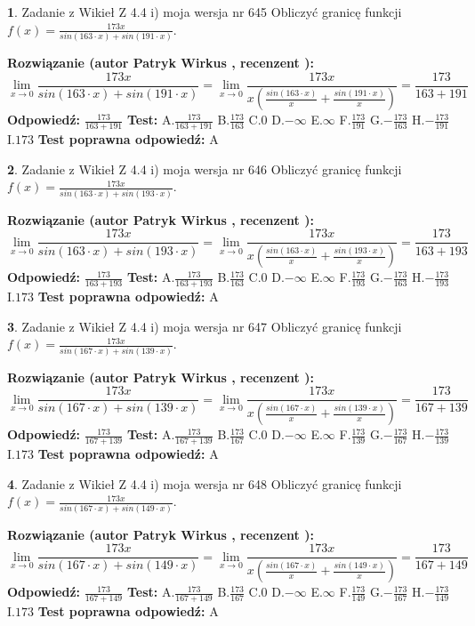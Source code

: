 \documentclass[12pt, a4paper]{article}
\theoremstyle{definition} %
\newtheorem{zad}{}
\newcommand{\zadStart}[1]{\begin{zad}#1\newline}
\newcommand{\zadStop}{\end{zad}}
\newcommand{\rozwStart}[2]{\noindent \textbf{Rozwiązanie (autor #1 , recenzent #2): }\newline}
\newcommand{\rozwStop}{\newline}
\newcommand{\odpStart}{\noindent \textbf{Odpowiedź:}\newline}
\newcommand{\odpStop}{\newline}
\newcommand{\testStart}{\noindent \textbf{Test:}\newline}
\newcommand{\testStop}{\newline}
\newcommand{\kluczStart}{\noindent \textbf{Test poprawna odpowiedź:}\newline}
\newcommand{\kluczStop}{\newline}
\begin{document}
\zadStart{Zadanie z Wikieł Z 4.4 i) moja wersja nr 645}
Obliczyć granicę funkcji $f(x)=\frac{173x}{sin(163\cdot x) +sin(191\cdot x)}$.
\zadStop
\rozwStart{Patryk Wirkus}{}
$$\lim\limits_{x\to 0}\frac{173x}{sin(163\cdot x) +sin(191\cdot x)}=\lim\limits_{x\to 0}\frac{173x}{x(\frac{sin(163\cdot x)}{x}+\frac{sin(191\cdot x)}{x})}=\frac{173}{163+191}$$
\rozwStop
\odpStart
$\frac{173}{163+191}$
\odpStop
\testStart
A.$\frac{173}{163+191}$
B.$\frac{173}{163}$
C.$0$
D.$-\infty$
E.$\infty$
F.$\frac{173}{191}$
G.$-\frac{173}{163}$
H.$-\frac{173}{191}$
I.$173$
\testStop
\kluczStart
A
\kluczStop



\zadStart{Zadanie z Wikieł Z 4.4 i) moja wersja nr 646}
Obliczyć granicę funkcji $f(x)=\frac{173x}{sin(163\cdot x) +sin(193\cdot x)}$.
\zadStop
\rozwStart{Patryk Wirkus}{}
$$\lim\limits_{x\to 0}\frac{173x}{sin(163\cdot x) +sin(193\cdot x)}=\lim\limits_{x\to 0}\frac{173x}{x(\frac{sin(163\cdot x)}{x}+\frac{sin(193\cdot x)}{x})}=\frac{173}{163+193}$$
\rozwStop
\odpStart
$\frac{173}{163+193}$
\odpStop
\testStart
A.$\frac{173}{163+193}$
B.$\frac{173}{163}$
C.$0$
D.$-\infty$
E.$\infty$
F.$\frac{173}{193}$
G.$-\frac{173}{163}$
H.$-\frac{173}{193}$
I.$173$
\testStop
\kluczStart
A
\kluczStop



\zadStart{Zadanie z Wikieł Z 4.4 i) moja wersja nr 647}
Obliczyć granicę funkcji $f(x)=\frac{173x}{sin(167\cdot x) +sin(139\cdot x)}$.
\zadStop
\rozwStart{Patryk Wirkus}{}
$$\lim\limits_{x\to 0}\frac{173x}{sin(167\cdot x) +sin(139\cdot x)}=\lim\limits_{x\to 0}\frac{173x}{x(\frac{sin(167\cdot x)}{x}+\frac{sin(139\cdot x)}{x})}=\frac{173}{167+139}$$
\rozwStop
\odpStart
$\frac{173}{167+139}$
\odpStop
\testStart
A.$\frac{173}{167+139}$
B.$\frac{173}{167}$
C.$0$
D.$-\infty$
E.$\infty$
F.$\frac{173}{139}$
G.$-\frac{173}{167}$
H.$-\frac{173}{139}$
I.$173$
\testStop
\kluczStart
A
\kluczStop



\zadStart{Zadanie z Wikieł Z 4.4 i) moja wersja nr 648}
Obliczyć granicę funkcji $f(x)=\frac{173x}{sin(167\cdot x) +sin(149\cdot x)}$.
\zadStop
\rozwStart{Patryk Wirkus}{}
$$\lim\limits_{x\to 0}\frac{173x}{sin(167\cdot x) +sin(149\cdot x)}=\lim\limits_{x\to 0}\frac{173x}{x(\frac{sin(167\cdot x)}{x}+\frac{sin(149\cdot x)}{x})}=\frac{173}{167+149}$$
\rozwStop
\odpStart
$\frac{173}{167+149}$
\odpStop
\testStart
A.$\frac{173}{167+149}$
B.$\frac{173}{167}$
C.$0$
D.$-\infty$
E.$\infty$
F.$\frac{173}{149}$
G.$-\frac{173}{167}$
H.$-\frac{173}{149}$
I.$173$
\testStop
\kluczStart
A
\kluczStop
\end{document}
